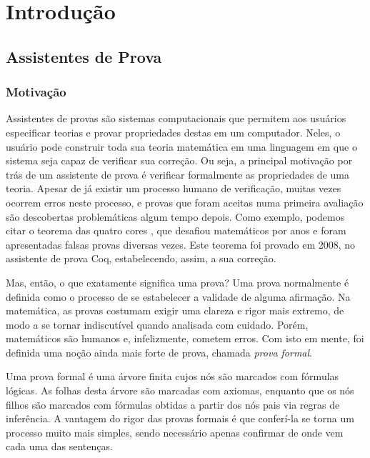 \chapter{Introdução}

\section{Assistentes de Prova} 
\subsection{Motivação}

Assistentes de provas são sistemas computacionais que permitem aos usuários
especificar teorias e provar propriedades destas em um computador. Neles, o
usuário pode construir toda sua teoria matemática em uma linguagem em que o
sistema seja capaz de verificar sua correção. Ou seja, a principal motivação por
trás de um assistente de prova é verificar formalmente as propriedades de uma
teoria. Apesar de já existir um processo humano de verificação, muitas vezes
ocorrem erros neste processo, e provas que foram aceitas numa primeira avaliação
são descobertas problemáticas algum tempo depois. Como exemplo, podemos citar o
teorema das quatro cores \cite{four_colour}, que desafiou matemáticos por anos e
foram apresentadas falsas provas diversas vezes. Este teorema foi provado em
2008, no assistente de prova  Coq, estabelecendo, assim, a sua correção.
\cite{4colproof, gonthieril:_four_colour_theor}

Mas, então, o que exatamente significa uma prova? Uma prova normalmente é
definida como o processo de se estabelecer a validade de alguma afirmação. Na
matemática, as provas costumam exigir uma clareza e rigor mais extremo, de modo
a se tornar indiscutível quando analisada com cuidado. Porém, matemáticos são
humanos e, infelizmente, cometem erros. Com isto em mente, foi definida uma
noção ainda mais forte de prova, chamada \emph{prova formal}.

Uma prova formal é uma árvore finita cujos nós são marcados com fórmulas
lógicas. As folhas desta árvore são marcadas com axiomas, enquanto que os nós
filhos são marcados com fórmulas obtidas a partir dos nós pais via regras de
inferência. A vantagem do rigor das provas formais é que conferí-la se torna um
processo muito mais simples, sendo necessário apenas confirmar de onde vem cada
uma das sentenças.

